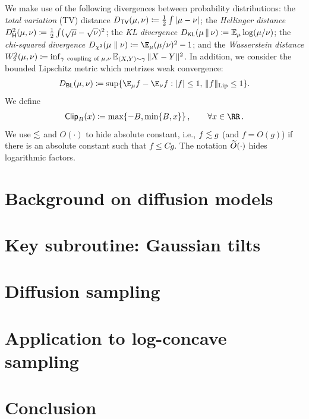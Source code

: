 \documentclass{article} %
\begin{document}
We make use of the following divergences between probability distributions: the \emph{total variation} (TV) distance $\Dtv{\mu}{\nu} \deq \frac{1}{2}\int|\mu-\nu|$; the \emph{Hellinger distance} $\Dhels{\mu}{\nu} \deq \frac12\int (\sqrt\mu-\sqrt\nu)^2$; the \emph{KL divergence} $\Dkl{\mu}{\nu} \deq \En_\mu\log(\mu/\nu)$; the \emph{chi-squared divergence} $\Dchis{\mu}{\nu} \deq \E_\mu (\mu/\nu)^2 - 1$; and the \emph{Wasserstein distance} $W_2^2(\mu,\nu) \coloneqq \inf_{\gamma~\text{coupling of }\mu,\nu} \operatorname{\mathbb{E}}_{(X,Y)\sim\gamma}\|X-Y\|^2$.
In addition, we consider the bounded Lipschitz metric which metrizes weak convergence:
\begin{align*}
    \Dbl{\mu}{\nu} \deq \sup\{\E_\mu f - \E_\nu f : |f| \le 1,\,\|f\|_{\rm Lip} \le 1\}.
\end{align*}
We define
\begin{align}\notag
    \pclip[\B]{x}\deq \max\crl{-B,\min\crl{B,x}}\,, \qquad \forall x\in\RR\,.
\end{align}
We use $\lesssim$ and $O(\cdot)$ to hide absolute constant, i.e., $f\lesssim g$ (and $f=O(g)$) if there is an absolute constant such that $f\leq Cg$.
The notation $\widetilde{O}(\cdot)$ hides logarithmic factors.


\section{Background on diffusion models}







\section{Key subroutine: Gaussian tilts}\label{sec:gaussian_tilts}


\section{Diffusion sampling}\label{sec:diffusion}


\section{Application to log-concave sampling}\label{sec:log_concave}



\section{Conclusion}
\end{document}
